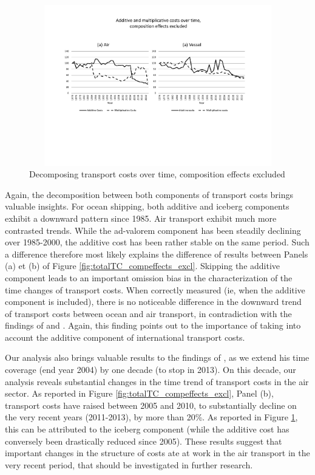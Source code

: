 \documentclass[a4paper,11pt]{article}
\begin{document}
\begin{figure}[htbp]
\caption{Decomposing transport costs over time,
composition effects excluded}
\label{fig:TC_add_mult_compeffects_excl}
\begin{center}
\includegraphics[width=14cm, height=7cm]{Fig3b_TCovertime_add_et_mult_3d.pdf}
\end{center}
\end{figure}

Again, the decomposition between both components of transport costs brings valuable insights. For ocean shipping, both additive and iceberg components exhibit a downward pattern since 1985. Air transport exhibit much more contrasted trends. While the ad-valorem component has been steadily declining over 1985-2000, the additive cost has been rather stable on the same period. Such a difference therefore most likely explains the difference of results between Panels (a) et (b) of Figure \ref{fig:totalTC_compeffects_excl}. Skipping the additive component leads to an important omission bias in the characterization of the time changes of transport costs. When correctly measured (ie, when the additive component is included), there is no noticeable difference in the downward trend of transport costs between ocean and air transport, in contradiction with the findings of \citet{hummels2007} and \cite{Behar_Venables}. Again, this finding points out to the importance of taking into account the additive component of international transport costs. \smallskip

Our analysis also brings valuable results to the findings of \citet{hummels2007}, as we extend his time coverage (end year 2004) by one decade (to stop in 2013). On this decade, our analysis reveals substantial changes in the time trend of transport costs in the air sector. As reported in Figure \ref{fig:totalTC_compeffects_excl}, Panel (b), transport costs have raised between 2005 and 2010, to substantially decline on the very recent years (2011-2013), by more than 20\%. As reported in Figure \ref{fig:TC_add_mult_compeffects_excl}, this can be attributed to the iceberg component (while the additive cost has conversely been drastically reduced since 2005). These results suggest that important changes in the structure of costs ate at work in the air transport in the very recent period, that should be investigated in further research.
\end{document}
